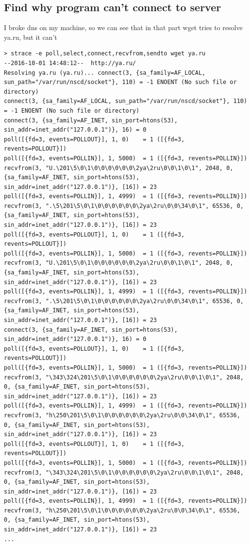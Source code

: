 \documentclass[10pt]{article}
\begin{document}
\subsection{Find why program can't connect to server}
I broke dns on my machine, so we can see that in that part wget tries to resolve ya.ru, but it can't
\begin{verbatim}
> strace -e poll,select,connect,recvfrom,sendto wget ya.ru
--2016-10-01 14:48:12--  http://ya.ru/
Resolving ya.ru (ya.ru)... connect(3, {sa_family=AF_LOCAL, sun_path="/var/run/nscd/socket"}, 110) = -1 ENOENT (No such file or directory)
connect(3, {sa_family=AF_LOCAL, sun_path="/var/run/nscd/socket"}, 110) = -1 ENOENT (No such file or directory)
connect(3, {sa_family=AF_INET, sin_port=htons(53), sin_addr=inet_addr("127.0.0.1")}, 16) = 0
poll([{fd=3, events=POLLOUT}], 1, 0)    = 1 ([{fd=3, revents=POLLOUT}])
poll([{fd=3, events=POLLIN}], 1, 5000)  = 1 ([{fd=3, revents=POLLIN}])
recvfrom(3, "U.\201\5\0\1\0\0\0\0\0\0\2ya\2ru\0\0\1\0\1", 2048, 0, {sa_family=AF_INET, sin_port=htons(53), sin_addr=inet_addr("127.0.0.1")}, [16]) = 23
poll([{fd=3, events=POLLIN}], 1, 4999)  = 1 ([{fd=3, revents=POLLIN}])
recvfrom(3, ".\5\201\5\0\1\0\0\0\0\0\0\2ya\2ru\0\0\34\0\1", 65536, 0, {sa_family=AF_INET, sin_port=htons(53), sin_addr=inet_addr("127.0.0.1")}, [16]) = 23
poll([{fd=3, events=POLLOUT}], 1, 0)    = 1 ([{fd=3, revents=POLLOUT}])
poll([{fd=3, events=POLLIN}], 1, 5000)  = 1 ([{fd=3, revents=POLLIN}])
recvfrom(3, "U.\201\5\0\1\0\0\0\0\0\0\2ya\2ru\0\0\1\0\1", 2048, 0, {sa_family=AF_INET, sin_port=htons(53), sin_addr=inet_addr("127.0.0.1")}, [16]) = 23
poll([{fd=3, events=POLLIN}], 1, 4999)  = 1 ([{fd=3, revents=POLLIN}])
recvfrom(3, ".\5\201\5\0\1\0\0\0\0\0\0\2ya\2ru\0\0\34\0\1", 65536, 0, {sa_family=AF_INET, sin_port=htons(53), sin_addr=inet_addr("127.0.0.1")}, [16]) = 23
connect(3, {sa_family=AF_INET, sin_port=htons(53), sin_addr=inet_addr("127.0.0.1")}, 16) = 0
poll([{fd=3, events=POLLOUT}], 1, 0)    = 1 ([{fd=3, revents=POLLOUT}])
poll([{fd=3, events=POLLIN}], 1, 5000)  = 1 ([{fd=3, revents=POLLIN}])
recvfrom(3, "\343\324\201\5\0\1\0\0\0\0\0\0\2ya\2ru\0\0\1\0\1", 2048, 0, {sa_family=AF_INET, sin_port=htons(53), sin_addr=inet_addr("127.0.0.1")}, [16]) = 23
poll([{fd=3, events=POLLIN}], 1, 4999)  = 1 ([{fd=3, revents=POLLIN}])
recvfrom(3, "h\250\201\5\0\1\0\0\0\0\0\0\2ya\2ru\0\0\34\0\1", 65536, 0, {sa_family=AF_INET, sin_port=htons(53), sin_addr=inet_addr("127.0.0.1")}, [16]) = 23
poll([{fd=3, events=POLLOUT}], 1, 0)    = 1 ([{fd=3, revents=POLLOUT}])
poll([{fd=3, events=POLLIN}], 1, 5000)  = 1 ([{fd=3, revents=POLLIN}])
recvfrom(3, "\343\324\201\5\0\1\0\0\0\0\0\0\2ya\2ru\0\0\1\0\1", 2048, 0, {sa_family=AF_INET, sin_port=htons(53), sin_addr=inet_addr("127.0.0.1")}, [16]) = 23
poll([{fd=3, events=POLLIN}], 1, 4999)  = 1 ([{fd=3, revents=POLLIN}])
recvfrom(3, "h\250\201\5\0\1\0\0\0\0\0\0\2ya\2ru\0\0\34\0\1", 65536, 0, {sa_family=AF_INET, sin_port=htons(53), sin_addr=inet_addr("127.0.0.1")}, [16]) = 23
...
\end{verbatim}
\end{document}
